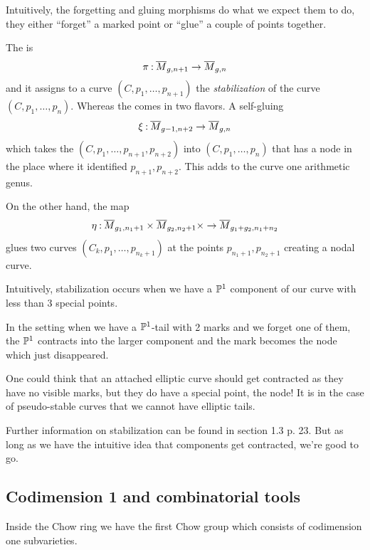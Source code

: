 \documentclass[12pt]{memoir}
\begin{document}
Intuitively, the forgetting and gluing morphisms do what we expect them to do, they either ``forget'' a marked point or ``glue'' a couple of points together.  

\begin{Def}
    The  is 
    $$\pi\mathbin{:}\overline M_{g,n+1}\to\overline M_{g,n}$$ 
    and it assigns to a curve $(C,p_1,\dots,p_{n+1})$ the \emph{stabilization} of the curve $(C,p_1,\dots,p_n)$. Whereas the  comes in two flavors. A self-gluing 
    $$\xi\mathbin{:}\overline M_{g-1,n+2}\to\overline M_{g,n}$$
    which takes the $(C,p_1,\dots,p_{n+1},p_{n+2})$ into $(C,p_1,\dots,p_n)$ that has a node in the place where it identified $p_{n+1},p_{n+2}$. This adds to the curve one arithmetic genus.\par
    On the other hand, the map 
    $$\eta\mathbin{:}\overline M_{g_1,n_1+1}\times\overline M_{g_2,n_2+1}\times\to\overline M_{g_1+g_2,n_1+n_2}$$
    glues two curves $(C_k,p_1,\dots,p_{n_k+1})$ at the points $p_{n_1+1},p_{n_2+1}$ creating a nodal curve.
\end{Def}

Intuitively, stabilization occurs when we have a $\mathbb{P}^1$ component of our curve with less than 3 special points.

\begin{Ex}
    In the setting when we have a $\mathbb{P}^1$-tail with 2 marks and we forget one of them, the $\mathbb{P}^1$ contracts into the larger component and the mark becomes the node which just disappeared.
\end{Ex}

\begin{Rmk}
    One could think that an attached elliptic curve should get contracted as they have no visible marks, but they do have a special point, the node! It is in the case of pseudo-stable curves that we cannot have elliptic tails.
\end{Rmk}

Further information on stabilization can be found in \cite{GreenBookKockVainsencher} section 1.3 p. 23. But as long as we have the intuitive idea that components get contracted, we're good to go.

\subsection{Codimension 1 and combinatorial tools}

Inside the Chow ring we have the first Chow group which consists of codimension one subvarieties. 
\end{document}
